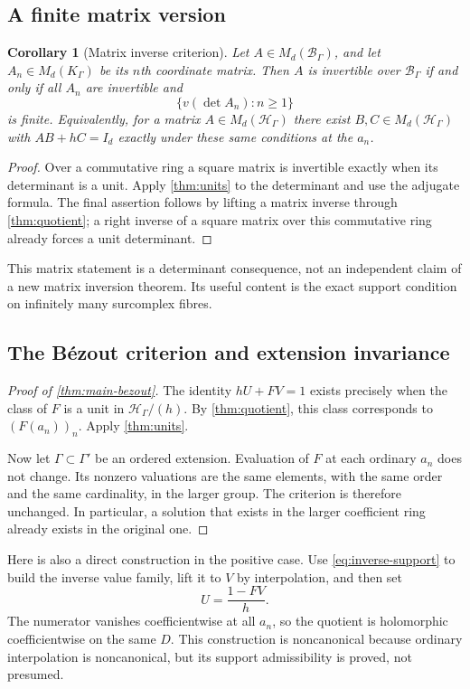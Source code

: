 \documentclass[11pt,letterpaper]{article}
\numberwithin{equation}{section}
\newtheorem{corollary}[theorem]{Corollary}
\theoremstyle{definition}
\theoremstyle{remark}
\newcommand{\HH}{\mathcal H}
\newcommand{\BB}{\mathcal B}
\begin{document}
\subsection{A finite matrix version}
\begin{corollary}[Matrix inverse criterion]\label{cor:matrix}
Let $A\in M_d(\BB_\Gamma)$, and let $A_n\in M_d(K_\Gamma)$ be its
$n$th coordinate matrix. Then $A$ is invertible over $\BB_\Gamma$ if and
only if all $A_n$ are invertible and
\[
 \{v(\det A_n):n\ge1\}
\]
is finite. Equivalently, for a matrix $A\in M_d(\HH_\Gamma)$ there exist
$B,C\in M_d(\HH_\Gamma)$ with $AB+hC=I_d$ exactly under these same
conditions at the $a_n$.
\end{corollary}
\begin{proof}
Over a commutative ring a square matrix is invertible exactly when its
determinant is a unit. Apply \cref{thm:units} to the determinant and use
the adjugate formula. The final assertion follows by lifting a matrix
inverse through \cref{thm:quotient}; a right inverse of a square matrix
over this commutative ring already forces a unit determinant.
\end{proof}
This matrix statement is a determinant consequence, not an independent
claim of a new matrix inversion theorem. Its useful content is the exact
support condition on infinitely many surcomplex fibres.

\subsection{The B\'ezout criterion and extension invariance}
\begin{proof}[Proof of \cref{thm:main-bezout}]
The identity $hU+FV=1$ exists precisely when the class of $F$ is a unit
in $\HH_\Gamma/(h)$. By \cref{thm:quotient}, this class corresponds to
$(F(a_n))_n$. Apply \cref{thm:units}.

Now let $\Gamma\subset\Gamma'$ be an ordered extension. Evaluation of
$F$ at each ordinary $a_n$ does not change. Its nonzero valuations are
the same elements, with the same order and the same cardinality, in the
larger group. The criterion is therefore unchanged. In particular, a
solution that exists in the larger coefficient ring already exists in
the original one.
\end{proof}

Here is also a direct construction in the positive case. Use
\eqref{eq:inverse-support} to build the inverse value family, lift it to
$V$ by interpolation, and then set
\[
 U=\frac{1-FV}{h}.
\]
The numerator vanishes coefficientwise at all $a_n$, so the quotient is
holomorphic coefficientwise on the same $D$. This construction is
noncanonical because ordinary interpolation is noncanonical, but its
support admissibility is proved, not presumed.
\end{document}
